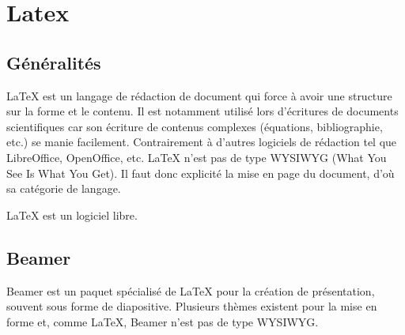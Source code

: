 \section{Latex}

\subsection{Généralités}
\LaTeX{} est un langage de rédaction de document qui force à avoir une structure sur la forme et le contenu. Il est notamment utilisé lors d'écritures de documents scientifiques car son écriture de contenus complexes (équations, bibliographie, etc.) se manie facilement.
Contrairement à d'autres logiciels de rédaction tel que LibreOffice, OpenOffice, etc. \LaTeX{} n'est pas de type WYSIWYG (What You See Is What You Get). Il faut donc explicité la mise en page du document, d'où sa catégorie de langage.

\LaTeX{} est un logiciel libre.

\subsection{Beamer}
Beamer est un paquet spécialisé de LaTeX pour la création de présentation, souvent sous forme de diapositive. Plusieurs thèmes existent pour la mise en forme et, comme \LaTeX{}, Beamer n'est pas de type WYSIWYG.

